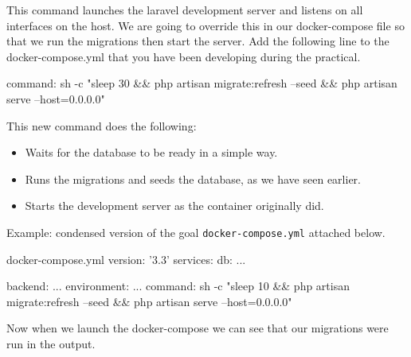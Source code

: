 \documentclass{csse4400}
\begin{document}

This command launches the laravel development server and listens on all interfaces on the host.
We are going to override this in our docker-compose file so that we run the migrations then start the server.
Add the following line to the docker-compose.yml that you have been developing during the practical.

\begin{code}[language=docker-compose]{}
  command: sh -c "sleep 30 && php artisan migrate:refresh --seed && php artisan serve --host=0.0.0.0"
\end{code}

This new command does the following:

\begin{itemize}
  \item Waits for the database to be ready in a simple way.
  \item Runs the migrations and seeds the database, as we have seen earlier.
  \item Starts the development server as the container originally did.
\end{itemize}

Example: condensed version of the goal \texttt{docker-compose.yml} attached below.

\begin{code}[language=docker-compose]{docker-compose.yml}
  version: '3.3'
  services:
    db:
      ...
  
    backend:
      ...
      environment:
        ...
      command: sh -c "sleep 10 && php artisan migrate:refresh --seed && php artisan serve --host=0.0.0.0"
\end{code}

Now when we launch the docker-compose we can see that our migrations were run in the output.

\end{document}
